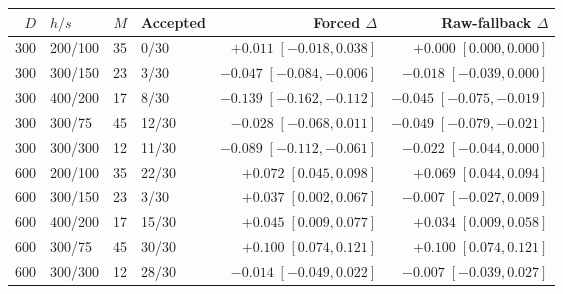 \begin{tabular}{rlrlrr}
\toprule
$D$ & $h/s$ & $M$ & Accepted & Forced $\Delta$ & Raw-fallback $\Delta$ \\
\midrule
300 & 200/100 & 35 & 0/30 & $+0.011\;[-0.018,0.038]$ & $+0.000\;[0.000,0.000]$ \\
300 & 300/150 & 23 & 3/30 & $-0.047\;[-0.084,-0.006]$ & $-0.018\;[-0.039,0.000]$ \\
300 & 400/200 & 17 & 8/30 & $-0.139\;[-0.162,-0.112]$ & $-0.045\;[-0.075,-0.019]$ \\
300 & 300/75 & 45 & 12/30 & $-0.028\;[-0.068,0.011]$ & $-0.049\;[-0.079,-0.021]$ \\
300 & 300/300 & 12 & 11/30 & $-0.089\;[-0.112,-0.061]$ & $-0.022\;[-0.044,0.000]$ \\
600 & 200/100 & 35 & 22/30 & $+0.072\;[0.045,0.098]$ & $+0.069\;[0.044,0.094]$ \\
600 & 300/150 & 23 & 3/30 & $+0.037\;[0.002,0.067]$ & $-0.007\;[-0.027,0.009]$ \\
600 & 400/200 & 17 & 15/30 & $+0.045\;[0.009,0.077]$ & $+0.034\;[0.009,0.058]$ \\
600 & 300/75 & 45 & 30/30 & $+0.100\;[0.074,0.121]$ & $+0.100\;[0.074,0.121]$ \\
600 & 300/300 & 12 & 28/30 & $-0.014\;[-0.049,0.022]$ & $-0.007\;[-0.039,0.027]$ \\
\bottomrule
\end{tabular}
